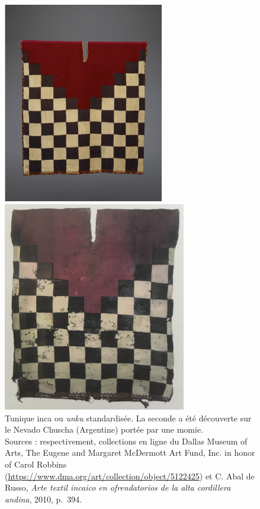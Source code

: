 \begin{figure}[!h]
	\begin{minipage}[c]{.5\linewidth}
        		\begin{center}
        			\includegraphics[width=7cm]{../images/unku_DMA.png}
        		\end{center}
	\end{minipage}
	\begin{minipage}[c]{.5\linewidth}
        		\begin{center}
			\includegraphics[width=8cm]{../images/unku_volcan.JPG}
        		\end{center}
	\end{minipage}
	\caption[Tunique inca ou \textit{unku} standardisée.]{Tunique inca ou \textit{unku} standardisée. La seconde a été découverte sur le Nevado Chuscha (Argentine) portée par une momie.\\ Sources : respectivement, collections en ligne du Dallas Museum of Arts, The Eugene and Margaret McDermott Art Fund, Inc. in honor of Carol Robbins (\url{https://www.dma.org/art/collection/object/5122425}) et C. Abal de Russo, \textit{Arte textil incaico en ofrendatorios de la alta cordillera andina}, 2010, p.~394.}
	\label{fig:damier}
\end{figure}

